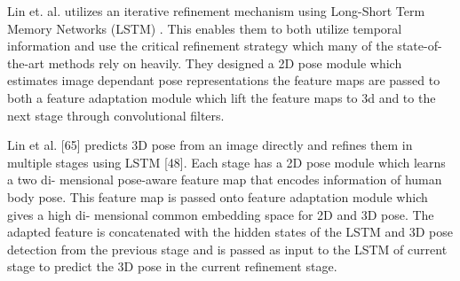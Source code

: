\parencite{hossain2017exploiting}
\parencite{hossain2017understanding}

Lin et. al. \parencite{lin2017recurrent} utilizes an iterative refinement mechanism using Long-Short Term Memory Networks (LSTM) \parencite{hochreiter1997long}. This enables them to both utilize temporal information and use the critical refinement strategy which many of the state-of-the-art methods rely on heavily. They designed a 2D pose module which estimates image dependant pose representations the feature maps are passed to both a feature adaptation module which lift the feature maps to 3d and to the next stage through convolutional filters. 

Lin et al. [65] predicts 3D pose from an image directly and refines them in multiple
stages using LSTM [48]. Each stage has a 2D pose module which learns a two di-
mensional pose-aware feature map that encodes information of human body pose.
This feature map is passed onto feature adaptation module which gives a high di-
mensional common embedding space for 2D and 3D pose. The adapted feature is
concatenated with the hidden states of the LSTM and 3D pose detection from the
previous stage and is passed as input to the LSTM of current stage to predict the
3D pose in the current refinement stage.

